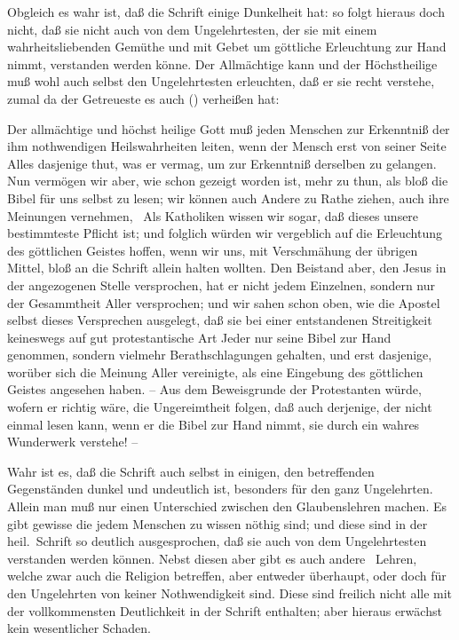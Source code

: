 \begin{aufza}
\item {} Obgleich es wahr ist, daß die Schrift einige Dunkelheit hat: so folgt hieraus doch nicht, daß sie nicht auch von dem Ungelehrtesten, der sie mit einem wahrheitsliebenden Gemüthe und mit Gebet um göttliche Erleuchtung zur Hand nimmt, verstanden werden könne. Der Allmächtige kann und der Höchstheilige muß wohl auch selbst den Ungelehrtesten erleuchten, daß er sie recht verstehe, zumal da der Getreueste es auch () verheißen hat: 
\item[\RWbet{Widerlegung.}] Der allmächtige und höchst heilige Gott muß jeden Menschen zur Erkenntniß der ihm nothwendigen Heilswahrheiten leiten, wenn der Mensch erst von seiner Seite Alles dasjenige thut, was er vermag, um zur Erkenntniß derselben zu gelangen. Nun vermögen wir aber, wie schon gezeigt worden ist, mehr zu thun, als bloß die Bibel für uns selbst zu lesen; wir können auch Andere zu Rathe ziehen, auch ihre Meinungen vernehmen, \usw\ Als Katholiken wissen wir sogar, daß dieses unsere bestimmteste Pflicht ist; und folglich würden wir vergeblich auf die Erleuchtung des göttlichen Geistes hoffen, wenn wir uns, mit Verschmähung der übrigen Mittel, bloß an die Schrift allein halten wollten. Den Beistand aber, den Jesus in der angezogenen Stelle versprochen, hat er nicht jedem Einzelnen, sondern nur der Gesammtheit Aller versprochen; und wir sahen schon oben, wie die Apostel selbst dieses Versprechen ausgelegt, daß sie bei einer entstandenen Streitigkeit keineswegs auf gut protestantische Art Jeder nur seine Bibel zur Hand genommen, sondern vielmehr Berathschlagungen gehalten, und erst dasjenige, worüber sich die Meinung Aller vereinigte, als eine Eingebung des göttlichen Geistes angesehen haben. -- Aus dem Beweisgrunde der Protestanten würde, wofern er richtig wäre, die Ungereimtheit folgen, daß auch derjenige, der nicht einmal lesen kann, wenn er die Bibel zur Hand nimmt, sie durch ein wahres Wunderwerk verstehe! --
\item {} Wahr ist es, daß die Schrift auch selbst in einigen, den  betreffenden Gegenständen dunkel und undeutlich ist, besonders für den ganz Ungelehrten. Allein man muß nur einen Unterschied zwischen den Glaubenslehren machen. Es gibt gewisse  die jedem Menschen zu wissen nöthig sind; und diese sind in der heil.\ Schrift so deutlich ausgesprochen, daß sie auch von dem Ungelehrtesten verstanden werden können. Nebst diesen aber gibt es auch andere  \dh\ Lehren, welche zwar auch die Religion betreffen, aber entweder überhaupt, oder doch für den Ungelehrten von keiner Nothwendigkeit sind. Diese sind freilich nicht alle mit der vollkommensten Deutlichkeit in der Schrift enthalten; aber hieraus erwächst kein wesentlicher Schaden.

\end{aufza}
